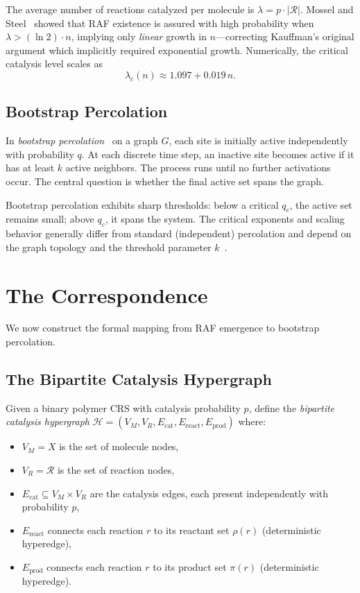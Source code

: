 \documentclass[preprint,12pt]{elsarticle}
\begin{document}
The average number of reactions catalyzed per molecule is
$\lambda = p \cdot |\mathcal{R}|$. Mossel and
Steel~\cite{mossel2005random} showed that RAF existence is
assured with high probability when $\lambda > (\ln 2) \cdot n$,
implying only \emph{linear} growth in $n$---correcting Kauffman's
original argument which implicitly required exponential growth.
Numerically, the critical catalysis level scales
as~\cite{hordijk2011required}
\begin{equation}
\lambda_c(n) \approx 1.097 + 0.019\,n.
\label{eq:lambda_c}
\end{equation}

\subsection{Bootstrap Percolation}
\label{sec:bootstrap}

In \emph{bootstrap percolation}~\cite{balogh2012sharp} on a
graph $G$, each site is initially active independently with
probability $q$. At each discrete time step, an inactive site
becomes active if it has at least $k$ active neighbors.
The process runs until no further activations occur. The central
question is whether the final active set spans the
graph.

Bootstrap percolation exhibits sharp thresholds: below a critical
$q_c$, the active set remains small; above $q_c$, it spans the
system. The critical exponents and scaling behavior generally
differ from standard (independent) percolation and depend on
the graph topology and the threshold parameter
$k$~\cite{balogh2012sharp}.

\section{The Correspondence}
\label{sec:correspondence}

We now construct the formal mapping from RAF emergence to
bootstrap percolation.

\subsection{The Bipartite Catalysis Hypergraph}
\label{sec:hypergraph}

Given a binary polymer CRS with catalysis probability $p$,
define the \emph{bipartite catalysis hypergraph}
$\mathcal{H} = (V_M, V_R, E_{\text{cat}}, E_{\text{react}},
E_{\text{prod}})$ where:
\begin{itemize}
\item $V_M = X$ is the set of molecule nodes,
\item $V_R = \mathcal{R}$ is the set of reaction nodes,
\item $E_{\text{cat}} \subseteq V_M \times V_R$ are the
catalysis edges, each present independently with probability $p$,
\item $E_{\text{react}}$ connects each reaction $r$ to its
reactant set $\rho(r)$ (deterministic hyperedge),
\item $E_{\text{prod}}$ connects each reaction $r$ to its
product set $\pi(r)$ (deterministic hyperedge).
\end{itemize}
\end{document}
